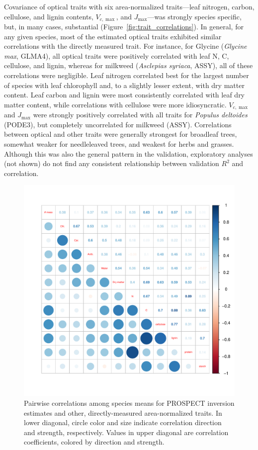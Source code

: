 Covariance of optical traits with six area-normalized traits---leaf nitrogen, carbon, cellulose, and lignin contents, $V_{c,\max}$, and $J_{\max}$---was strongly species specific, but, in many cases, substantial (Figure~\ref{fig:trait_correlations}).
In general, for any given species, most of the estimated optical traits exhibited similar correlations with the directly measured trait.
For instance, for Glycine (\textit{Glycine max}, GLMA4), all optical traits were positively correlated with leaf N, C, cellulose, and lignin, whereas for milkweed (\textit{Asclepias syriaca}, ASSY), all of these correlations were negligible.
Leaf nitrogen correlated best for the largest number of species with leaf chlorophyll and, to a slightly lesser extent, with dry matter content.
Leaf carbon and lignin were most consistently correlated with leaf dry matter content, while correlations with cellulose were more idiosyncratic.
$V_{c,\max}$ and $J_{\max}$ were strongly positively correlated with all traits for \textit{Populus deltoides} (PODE3), but completely uncorrelated for milkweed (ASSY).
Correlations between optical and other traits were generally strongest for broadleaf trees, somewhat weaker for needleleaved trees, and weakest for herbs and grasses.
Although this was also the general pattern in the validation, exploratory analyses (not shown) do not find any consistent relationship between validation $R^2$ and correlation.

\begin{figure}
  \centering
  \includegraphics[width=\textwidth]{3_prospect/figures/trait_correlations_species.pdf}
  \caption{%
    Pairwise correlations among species means for PROSPECT inversion estimates and other, directly-measured area-normalized traits.
    In lower diagonal, circle color and size indicate correlation direction and strength, respectively.
    Values in upper diagonal are correlation coefficients, colored by direction and strength.
  }\label{fig:trait_correlations_species}
\end{figure}

